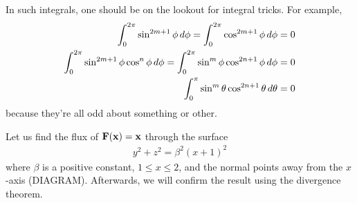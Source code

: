 \documentclass{../../template/note}
\begin{document}
    \begin{remark*}
        In such integrals, one should be on the lookout for integral tricks. For example,
        \begin{align*}
            \int_0^{2\pi} \sin^{2m+1} \phi \,d{\phi} = \int_0^{2\pi} \cos^{2m+1} \phi \,d{\phi} &= 0 \\
            \int_0^{2\pi} \sin^{2m+1} \phi \cos^n \phi \,d{\phi} = \int_0^{2\pi} \sin^m \phi \cos^{2n+1} \phi \,d{\phi} &= 0 \\
            \int_0^{\pi} \sin^m \theta \cos^{2n+1} \theta \,d{\theta} &= 0
        \end{align*}
        because they're all odd about something or other.
    \end{remark*}
    
    \begin{example*}[hard]
        Let us find the flux of \(\V F(\V x) = \V x\) through the surface
        \begin{align*}
            y^2 + z^2 = \beta^2(x+1)^2
        \end{align*}
        where \(\beta\) is a positive constant, \(1 \leq x \leq 2\), and the normal points away from the \(x\)-axis (DIAGRAM). Afterwards, we will confirm the result using the divergence theorem.
        

\end{example*}
\end{document}
